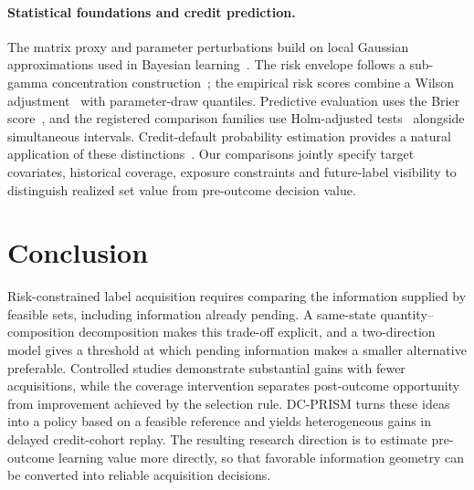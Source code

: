 \documentclass[runningheads]{llncs}
\begin{document}
\paragraph{Statistical foundations and credit prediction.}
The matrix proxy and parameter perturbations build on local Gaussian approximations used in Bayesian learning~\cite{mackay1992practical}. The risk envelope follows a sub-gamma concentration construction~\cite{boucheron2013concentration}; the empirical risk scores combine a Wilson adjustment~\cite{wilson1927probable} with parameter-draw quantiles. Predictive evaluation uses the Brier score~\cite{brier1950verification}, and the registered comparison families use Holm-adjusted tests~\cite{holm1979simple} alongside simultaneous intervals. Credit-default probability estimation provides a natural application of these distinctions~\cite{yeh2009comparison}. Our comparisons jointly specify target covariates, historical coverage, exposure constraints and future-label visibility to distinguish realized set value from pre-outcome decision value.

\section{Conclusion}
Risk-constrained label acquisition requires comparing the information supplied by feasible sets, including information already pending. A same-state quantity--composition decomposition makes this trade-off explicit, and a two-direction model gives a threshold at which pending information makes a smaller alternative preferable. Controlled studies demonstrate substantial gains with fewer acquisitions, while the coverage intervention separates post-outcome opportunity from improvement achieved by the selection rule. DC-PRISM turns these ideas into a policy based on a feasible reference and yields heterogeneous gains in delayed credit-cohort replay. The resulting research direction is to estimate pre-outcome learning value more directly, so that favorable information geometry can be converted into reliable acquisition decisions.

\clearpage


\end{document}
